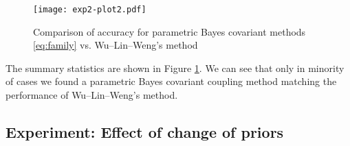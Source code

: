 \begin{figure}[!ht]
\texttt{[image: exp2-plot2.pdf]}
\caption{Comparison of accuracy for parametric Bayes covariant methods \eqref{eq:family} vs. Wu--Lin--Weng's method}
\label{fig:par-bc}
\end{figure}

The summary statistics are shown in Figure \ref{fig:par-bc}.
We can see that only in minority of cases we found a parametric Bayes covariant coupling method matching the performance of Wu--Lin--Weng's method. 

%
%
%
%
%
%
%
%

\subsection{Experiment: Effect of change of priors}  \label{sec:exp4}

